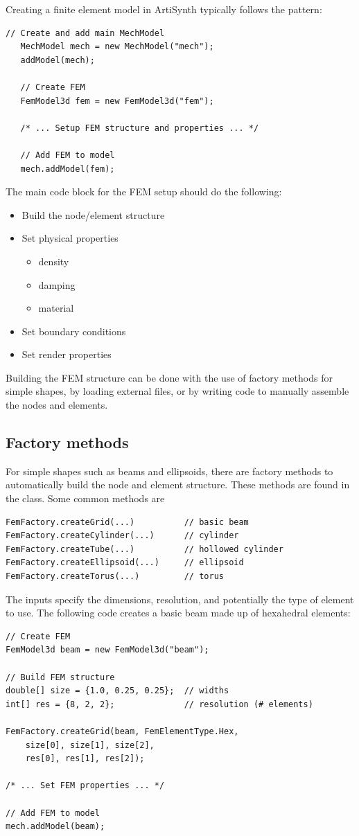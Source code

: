 Creating a finite element model in ArtiSynth typically follows the pattern:
\begin{lstlisting}[]
   // Create and add main MechModel
   MechModel mech = new MechModel("mech");
   addModel(mech);
      
   // Create FEM
   FemModel3d fem = new FemModel3d("fem");
   
   /* ... Setup FEM structure and properties ... */
   
   // Add FEM to model
   mech.addModel(fem); 
\end{lstlisting}
The main code block for the FEM setup should do the following:
\begin{itemize}
	\setlength{\itemsep}{-0.3em}
	\item Build the node/element structure
	\item Set physical properties%
	\ifLaTeXMLelse{}{\vspace{-0.5em}}
	\begin{itemize}
		\setlength{\itemsep}{-0.3em}
		\item density
		\item damping
		\item material
	\end{itemize} 
	\item Set boundary conditions
	\item Set render properties
\end{itemize}
Building the FEM structure can be done with the use of factory
methods for simple shapes, by loading external files, or by writing code
to manually assemble the nodes and elements.

\subsection{Factory methods}

For simple shapes such as beams and ellipsoids, there are factory methods to 
automatically build the node and element structure.  These methods are found
in the  class.  Some common
methods are
\begin{lstlisting}[]
FemFactory.createGrid(...)          // basic beam
FemFactory.createCylinder(...)      // cylinder
FemFactory.createTube(...)          // hollowed cylinder
FemFactory.createEllipsoid(...)     // ellipsoid
FemFactory.createTorus(...)         // torus
\end{lstlisting}
The inputs specify the dimensions, resolution, and potentially the type
of element to use.  The following code creates a basic beam made up of
hexahedral elements:
\begin{lstlisting}[]
// Create FEM
FemModel3d beam = new FemModel3d("beam");
      
// Build FEM structure
double[] size = {1.0, 0.25, 0.25};  // widths
int[] res = {8, 2, 2};              // resolution (# elements)
      
FemFactory.createGrid(beam, FemElementType.Hex,
	size[0], size[1], size[2], 
	res[0], res[1], res[2]);

/* ... Set FEM properties ... */

// Add FEM to model
mech.addModel(beam);
\end{lstlisting}

